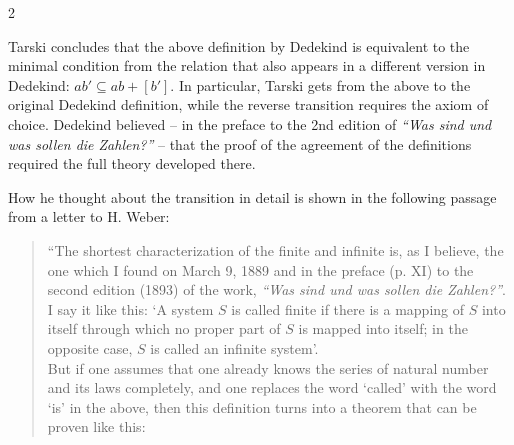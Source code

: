 \documentclass[leqno,hidelinks,10pt]{article}
\theoremstyle{definition}
\newcommand{\partof}{\subseteq}
\begin{document}
\begin{paracol}{2}
\begin{rightcolumn}
Tarski concludes that the above definition by Dedekind is equivalent to the
minimal condition from the relation that also appears in a different version in
Dedekind: $ab' \partof ab+[b']$. In particular, Tarski gets from the above to
the original Dedekind definition, while the reverse transition requires the axiom
of choice. Dedekind believed -- in the preface to the 2nd edition of
\emph{``Was sind und was sollen die Zahlen?''} -- that the proof of the agreement
of the definitions required the full theory developed there.
\

\smallskip

How he thought about the transition in detail is shown in the following passage
from a letter to H. Weber:

\begin{quote}
``The shortest characterization of the finite and infinite is, as I believe, the
one which I found on March 9, 1889 and in the preface (p. XI) to the second edition
(1893) of the work, \emph{``Was sind und was sollen die Zahlen?''}. I say it like
this: `A system $S$ is called finite if there is a mapping of $S$ into itself
through which no proper part of $S$ is mapped into itself; in the opposite case,
$S$ is called an infinite system'.
\ \\




\hspace{12pt} But if one assumes that one already knows the series of natural
number and its laws completely, and
one replaces the word `called' with the word `is' in the above, then this definition
turns into a theorem that can be proven like this: \\


\end{quote}
\end{rightcolumn}
\end{paracol}
\end{document}
